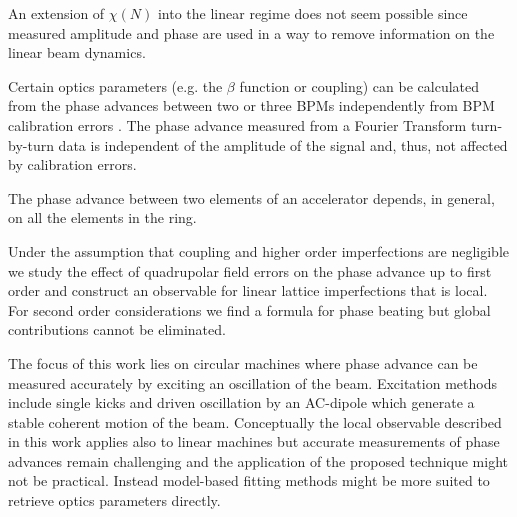 An extension of $\chi(N)$ into the linear regime does not seem possible since measured amplitude
and phase are used in a way to remove information on the linear beam dynamics.

Certain optics parameters (e.g. the $\beta$ function or coupling) can be calculated from the phase
advances between two or three BPMs \cite{Franchi2010, Miyamoto2010, Castro1996}
independently from BPM calibration errors \cite{Calaga2007}. 
The phase advance measured from a Fourier Transform \cite{Guo2016} turn-by-turn data is independent of the amplitude
of the signal and, thus, not affected by calibration errors.


The phase advance between two elements of an accelerator depends, in general, on all the elements in
the ring.


Under the assumption that coupling and higher order imperfections are negligible we
study the effect of quadrupolar field errors on the phase advance up to first order and construct an observable for
linear lattice imperfections that is local. For second order considerations we find a formula
for phase beating but global contributions cannot be eliminated.

The focus of this work lies on circular machines where phase advance can be measured accurately by
exciting an oscillation of the beam.
Excitation methods include single kicks and driven oscillation by an AC-dipole \cite{Miyamoto2008} which
generate a stable coherent motion of the beam.
Conceptually the local observable described in this work applies also to linear machines but accurate measurements
of phase advances remain challenging and the application of the proposed technique might not be practical.
Instead model-based fitting methods \cite{Zhang2018}
might be more suited to retrieve optics parameters directly.


